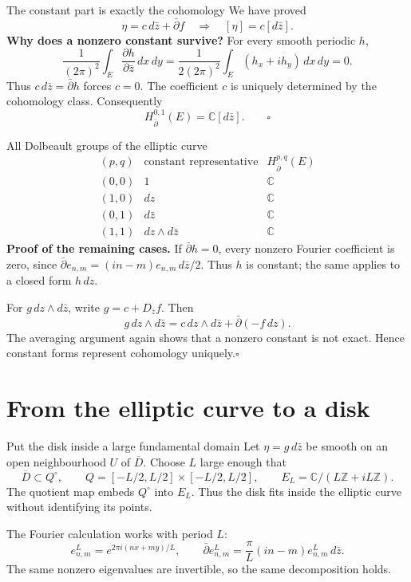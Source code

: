 \documentclass[aspectratio=169,11pt]{beamer}
\newcommand{\db}{\bar\partial}
\newcommand{\C}{\mathbb C}
\newcommand{\Z}{\mathbb Z}
\newcommand{\ee}{e_{n,m}}
\newcommand{\Dbar}{D_{\bar z}}
\begin{document}
\begin{frame}{The constant part is exactly the cohomology}
We have proved
\[
 \eta=c\,d\bar z+\db f
 \quad\Longrightarrow\quad [\eta]=c[d\bar z].
\]
\textbf{Why does a nonzero constant survive?}
For every smooth periodic $h$,
\[
 \frac1{(2\pi)^2}\int_E\frac{\partial h}{\partial\bar z}\,dx\,dy
 =\frac1{2(2\pi)^2}\int_E(h_x+i h_y)\,dx\,dy=0.
\]
Thus $c\,d\bar z=\db h$ forces $c=0$.
The coefficient $c$ is uniquely determined by the cohomology class.
Consequently
\[
 H^{0,1}_{\db}(E)=\C[d\bar z].\qquad\square
\]
\end{frame}

\begin{frame}{All Dolbeault groups of the elliptic curve}
\[
\begin{array}{c|c|c}
 (p,q)&\text{constant representative}&H^{p,q}_{\db}(E)\\\hline
 (0,0)&1&\C\\
 (1,0)&dz&\C\\
 (0,1)&d\bar z&\C\\
 (1,1)&dz\wedge d\bar z&\C
\end{array}
\]
\textbf{Proof of the remaining cases.}
If $\db h=0$, every nonzero Fourier coefficient is zero, since
$\db\ee=(in-m)\ee\,d\bar z/2$. Thus $h$ is constant;
the same applies to a closed form $h\,dz$.

For $g\,dz\wedge d\bar z$, write $g=c+\Dbar f$. Then
\[
 g\,dz\wedge d\bar z
 =c\,dz\wedge d\bar z+\db(-f\,dz).
\]
The averaging argument again shows that a nonzero constant is not exact.
Hence constant forms represent cohomology uniquely.\hfill$\square$
\end{frame}

\section{From the elliptic curve to a disk}
\begin{frame}{Put the disk inside a large fundamental domain}
Let $\eta=g\,d\bar z$ be smooth on an open neighbourhood $U$ of
$\overline D$. Choose $L$ large enough that
\[
 \overline D\subset Q^\circ,\qquad
 Q=[-L/2,L/2]\times[-L/2,L/2],\qquad
 E_L=\C/(L\Z+iL\Z).
\]
The quotient map embeds $Q^\circ$ into $E_L$.
Thus the disk fits inside the elliptic curve without identifying its points.

The Fourier calculation works with period $L$:
\[
 e^L_{n,m}=e^{2\pi i(nx+my)/L},\qquad
 \db e^L_{n,m}=\frac{\pi}{L}(in-m)e^L_{n,m}\,d\bar z.
\]
The same nonzero eigenvalues are invertible, so the same decomposition holds.
\end{frame}
\end{document}
